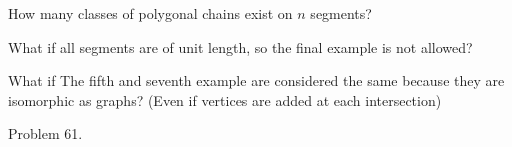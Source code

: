 \documentclass{article}
\begin{document}
  \begin{question}
    How many classes of polygonal chains exist on $n$ segments?
  \end{question}

  \begin{related}
    \item What if all segments are of unit length, so the final example is not
      allowed?
    \item What if The fifth and seventh example are considered the same because
      they are isomorphic as graphs? (Even if vertices are added at each
      intersection)
  \end{related}
  \begin{references}
    \item Problem 61.
  \end{references}
\end{document}
